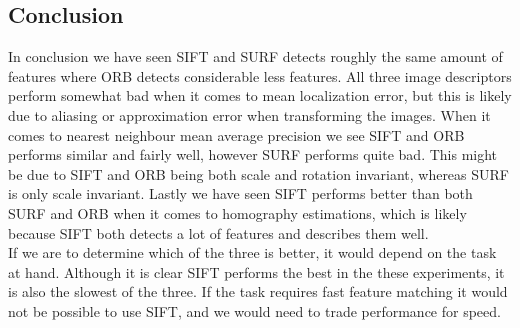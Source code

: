 \subsection{Conclusion}
In conclusion we have seen SIFT and SURF detects roughly the same amount of features where ORB detects considerable less features. All three image descriptors perform somewhat bad when it comes to mean localization error, but this is likely due to aliasing or approximation error when transforming the images. When it comes to nearest neighbour mean average precision we see SIFT and ORB performs similar and fairly well, however SURF performs quite bad. This might be due to SIFT and ORB being both scale and rotation invariant, whereas SURF is only scale invariant. Lastly we have seen SIFT performs better than both SURF and ORB when it comes to homography estimations, which is likely because SIFT both detects a lot of features and describes them well.\\
If we are to determine which of the three is better, it would depend on the task at hand. Although it is clear SIFT performs the best in the these experiments, it is also the slowest of the three. If the task requires fast feature matching it would not be possible to use SIFT, and we would need to trade performance for speed.